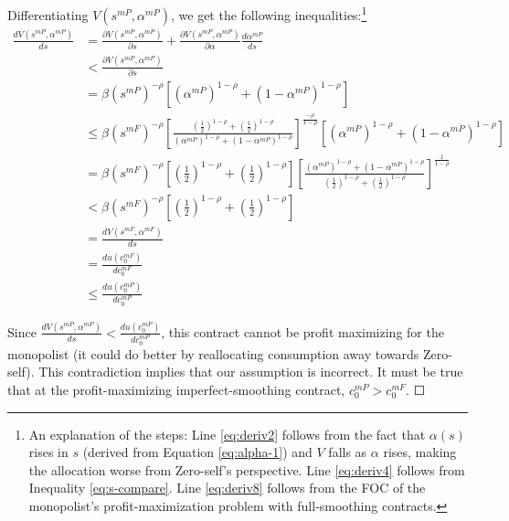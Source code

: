 \documentclass[11pt,english]{article}
\theoremstyle{plain}
\theoremstyle{definition}
\begin{document}
Differentiating $V\left(s^{mP},\alpha^{mP}\right)$, we get the following
inequalities:\footnote{An explanation of the steps: Line \ref{eq:deriv2} follows from the
fact that $\alpha\left(s\right)$ rises in $s$ (derived from Equation
\ref{eq:alpha-1}) and $V$ falls as $\alpha$ rises, making the allocation
worse from Zero-self's perspective. Line \ref{eq:deriv4} follows
from Inequality \ref{eq:s-compare}. Line \ref{eq:deriv8} follows
from the FOC of the monopolist's profit-maximization problem with
full-smoothing contracts. }
\begin{align}
\frac{dV\left(s^{mP},\alpha^{mP}\right)}{ds} & =\frac{\partial V\left(s^{mP},\alpha^{mP}\right)}{\partial s}+\frac{\partial V\left(s^{mP},\alpha^{mP}\right)}{\partial\alpha}\frac{d\alpha^{mP}}{ds}\label{eq:deriv1}\\
 & <\frac{\partial V\left(s^{mP},\alpha^{mP}\right)}{\partial s}\label{eq:deriv2}\\
 & =\beta\left(s^{mP}\right)^{-\rho}\left[\left(\alpha^{mP}\right)^{1-\rho}+\left(1-\alpha^{mP}\right)^{1-\rho}\right]\label{eq:deriv3}\\
 & \leq\beta\left(s^{mF}\right)^{-\rho}\left[\frac{\left(\frac{1}{2}\right)^{1-\rho}+\left(\frac{1}{2}\right)^{1-\rho}}{\left(\alpha^{mP}\right)^{1-\rho}+\left(1-\alpha^{mP}\right)^{1-\rho}}\right]^{\frac{-\rho}{1-\rho}}\left[\left(\alpha^{mP}\right)^{1-\rho}+\left(1-\alpha^{mP}\right)^{1-\rho}\right]\label{eq:deriv4}\\
 & =\beta\left(s^{mF}\right)^{-\rho}\left[\left(\frac{1}{2}\right)^{1-\rho}+\left(\frac{1}{2}\right)^{1-\rho}\right]\left[\frac{\left(\alpha^{mP}\right)^{1-\rho}+\left(1-\alpha^{mP}\right)^{1-\rho}}{\left(\frac{1}{2}\right)^{1-\rho}+\left(\frac{1}{2}\right)^{1-\rho}}\right]^{\frac{1}{1-\rho}}\label{eq:deriv5}\\
 & <\beta\left(s^{mF}\right)^{-\rho}\left[\left(\frac{1}{2}\right)^{1-\rho}+\left(\frac{1}{2}\right)^{1-\rho}\right]\label{eq:deriv6}\\
 & =\frac{dV\left(s^{mF},\alpha^{mF}\right)}{ds}\label{eq:deriv7}\\
 & =\frac{du\left(c_{0}^{mF}\right)}{dc_{0}^{mF}}\label{eq:deriv8}\\
 & \leq\frac{du\left(c_{0}^{mP}\right)}{dc_{0}^{mP}}\label{eq:deriv9}
\end{align}

Since $\frac{dV\left(s^{mP},\alpha^{mP}\right)}{ds}<\frac{du\left(c_{0}^{mP}\right)}{dc_{0}^{mP}}$,
this contract cannot be profit maximizing for the monopolist (it could
do better by reallocating consumption away towards Zero-self). This
contradiction implies that our assumption is incorrect. It must be
true that at the profit-maximizing imperfect-smoothing contract, $c_{0}^{mP}>c_{0}^{mF}$.
$\Square$
\end{document}
